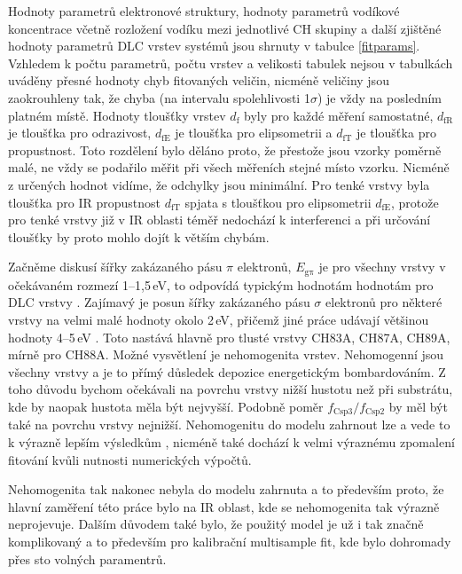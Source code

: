 Hodnoty parametrů elektronové struktury, hodnoty parametrů vodíkové koncentrace včetně rozložení vodíku mezi jednotlivé CH skupiny a další zjištěné hodnoty parametrů DLC vrstev systémů jsou shrnuty v tabulce \ref{fitparams}. Vzhledem k počtu parametrů, počtu vrstev a velikosti tabulek nejsou v tabulkách uváděny přesné hodnoty chyb fitovaných veličin, nicméně veličiny jsou zaokrouhleny tak, že chyba (na intervalu spolehlivosti 1$\sigma$) je vždy na posledním platném místě. Hodnoty tloušťky vrstev $d_\mathrm{f}$ byly pro každé měření samostatné, $d_\mathrm{fR}$ je tloušťka pro odrazivost, $d_\mathrm{fE}$ je tloušťka pro elipsometrii a $d_\mathrm{fT}$ je tloušťka pro propustnost. Toto rozdělení bylo děláno proto, že přestože jsou vzorky poměrně malé, ne vždy se podařilo měřit při všech měřeních stejné místo vzorku. Nicméně z určených hodnot vidíme, že odchylky jsou minimální. Pro tenké vrstvy byla tloušťka pro IR propustnost $d_\mathrm{fT}$ spjata s tloušťkou pro elipsometrii $d_\mathrm{fE}$, protože pro tenké vrstvy již v IR oblasti téměř nedochází k interferenci a při určování tloušťky by proto mohlo dojít k větším chybám. 

Začněme diskusí šířky zakázaného pásu $\pi$ elektronů, $E_\mathrm{g\pi}$ je pro všechny vrstvy v očekávaném rozmezí 1--1,5\,eV, to odpovídá typickým hodnotám hodnotám pro DLC vrstvy \cite{Demichelis1992, Franta2007}. 
Zajímavý je posun šířky zakázaného pásu $\sigma$ elektronů pro některé vrstvy na velmi malé hodnoty okolo 2\,eV, přičemž jiné práce udávají většinou hodnoty 4--5\,eV \cite{Demichelis1992, Franta2011}. Toto nastává hlavně pro tlusté vrstvy CH83A, CH87A, CH89A, mírně pro CH88A. Možné vysvětlení je nehomogenita vrstev. Nehomogenní jsou všechny vrstvy a je to přímý důsledek depozice energetickým bombardováním. 
Z toho důvodu bychom očekávali na povrchu vrstvy nižší hustotu než při substrátu, kde by naopak hustota měla být nejvyšší. Podobně poměr $f_\mathrm{Csp3}/f_\mathrm{Csp2}$ by měl být také na povrchu vrstvy nejnižší. Nehomogenitu do modelu zahrnout lze a vede to k výrazně lepším výsledkům \cite{Franta2011}, nicméně také dochází k velmi výraznému zpomalení fitování kvůli nutnosti numerických výpočtů. 

Nehomogenita tak nakonec nebyla do modelu zahrnuta a to především proto, že hlavní zaměření této práce bylo na IR oblast, kde se nehomogenita tak výrazně neprojevuje. Dalším důvodem také bylo, že použitý model je už i tak značně komplikovaný a to především pro kalibrační multisample fit, kde bylo dohromady přes sto volných paramentrů. 

